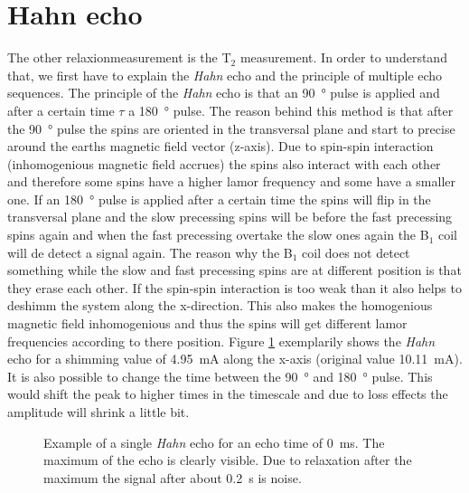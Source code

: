 \section{Hahn echo}
\label{sec:Hahnecho}
The other relaxionmeasurement is the T$_2$ measurement. In order to understand that, we first have to explain the \textit{Hahn} echo and the principle of multiple echo sequences.\newline
The principle of the \textit{Hahn} echo is that an \SI{90}{\degree} pulse is applied and after a certain time $\tau$ a \SI{180}{\degree} pulse. The reason behind this method is that after the \SI{90}{\degree} pulse the spins are oriented in the transversal plane and start to precise around the earths magnetic field vector (z-axis). Due to spin-spin interaction (inhomogenious magnetic field accrues) the spins also interact with each other and therefore some spins have a higher lamor frequency and some have a smaller one. If an \SI{180}{\degree} pulse is applied after a certain time the spins will flip in the transversal plane and the slow precessing spins will be before the fast precessing spins again and when the fast precessing  overtake the slow ones again the B$_1$ coil will de detect a signal again. The reason why the B$_1$ coil does not detect something while the slow and fast precessing spins are at different position is that they erase each other. If the spin-spin interaction is too weak than it also helps to deshimm the system along the x-direction. This also makes the homogenious magnetic field inhomogenious and thus the spins will get different lamor frequencies according to there position.\newline
Figure \ref{fig:Echobeispeilsignal} exemplarily shows the \textit{Hahn} echo for a shimming value of \SI{4.95}{\milli \ampere} along the x-axis (original value \SI{10.11}{\milli \ampere}). It is also possible to change the time between the \SI{90}{\degree} and \SI{180}{\degree} pulse. This would shift the peak to higher times in the timescale and due to loss effects the amplitude will shrink a little bit.
\begin{figure}[H]
    \centering
    
    \caption[Example of a single \textit{Hahn} echo for an echo time of \SI{0}{\milli \second}.]{Example of a single \textit{Hahn} echo for an echo time of \SI{0}{\milli \second}. The maximum of the echo is clearly visible. Due to relaxation after the maximum the signal after about \SI{0.2}{\second} is noise.}
    \label{fig:Echobeispeilsignal}
\end{figure}
